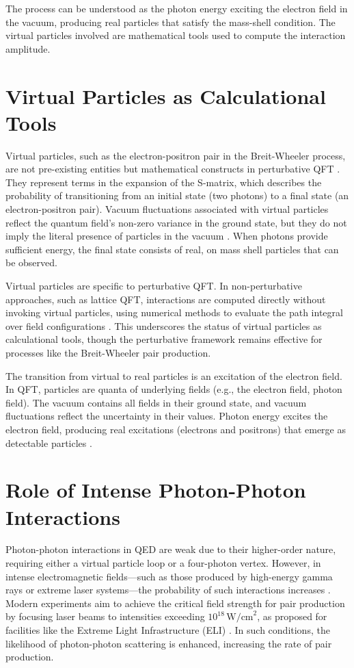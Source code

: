 \documentclass[aps,prl,twocolumn,superscriptaddress]{revtex4-2}
\begin{document}
	The process can be understood as the photon energy exciting the electron field in the vacuum, producing real particles that satisfy the mass-shell condition. The virtual particles involved are mathematical tools used to compute the interaction amplitude.
	
	\section{Virtual Particles as Calculational Tools}
	Virtual particles, such as the electron-positron pair in the Breit-Wheeler process, are not pre-existing entities but mathematical constructs in perturbative QFT \citep{Weinberg1995}. They represent terms in the expansion of the S-matrix, which describes the probability of transitioning from an initial state (two photons) to a final state (an electron-positron pair). Vacuum fluctuations associated with virtual particles reflect the quantum field’s non-zero variance in the ground state, but they do not imply the literal presence of particles in the vacuum \citep{Bjorken1964}. When photons provide sufficient energy, the final state consists of real, on mass shell particles that can be observed.
	
	Virtual particles are specific to perturbative QFT. In non-perturbative approaches, such as lattice QFT, interactions are computed directly without invoking virtual particles, using numerical methods to evaluate the path integral over field configurations \citep{Wilson1974}. This underscores the status of virtual particles as calculational tools, though the perturbative framework remains effective for processes like the Breit-Wheeler pair production.
	
	The transition from virtual to real particles is an excitation of the electron field. In QFT, particles are quanta of underlying fields (e.g., the electron field, photon field). The vacuum contains all fields in their ground state, and vacuum fluctuations reflect the uncertainty in their values. Photon energy excites the electron field, producing real excitations (electrons and positrons) that emerge as detectable particles \citep{Schwinger1951}.
	
	\section{Role of Intense Photon-Photon Interactions}
	Photon-photon interactions in QED are weak due to their higher-order nature, requiring either a virtual particle loop or a four-photon vertex. However, in intense electromagnetic fields—such as those produced by high-energy gamma rays or extreme laser systems—the probability of such interactions increases \citep{Schwinger1951}. Modern experiments aim to achieve the critical field strength for pair production by focusing laser beams to intensities exceeding \(10^{18} \, \text{W/cm}^2\), as proposed for facilities like the Extreme Light Infrastructure (ELI) \citep{Mourou2006}. In such conditions, the likelihood of photon-photon scattering is enhanced, increasing the rate of pair production.
	
\end{document}
